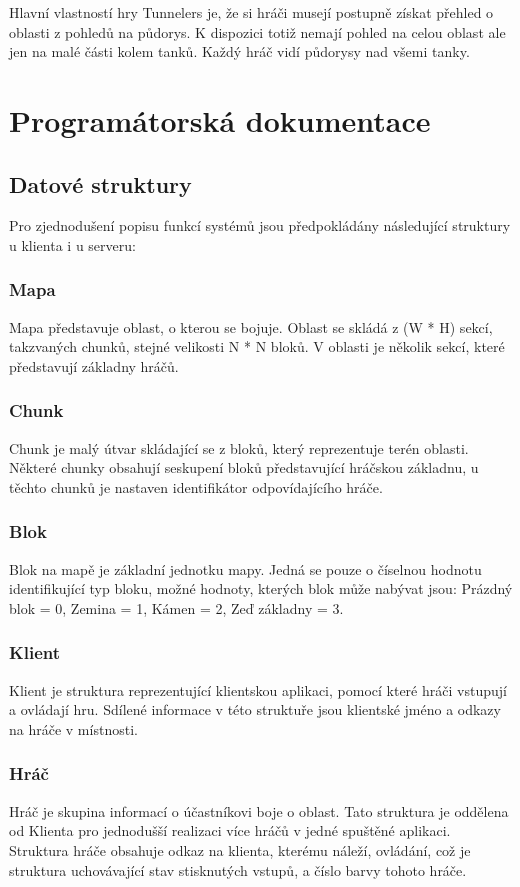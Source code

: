 \documentclass[12pt,a4paper]{article}
\let\oldsection\section
\renewcommand\section{\clearpage\oldsection}
\begin{document}
Hlavní vlastností hry Tunnelers je, že si hráči musejí postupně získat přehled o oblasti z pohledů na půdorys. K dispozici totiž nemají pohled na celou oblast ale jen na malé části kolem tanků. Každý hráč vidí půdorysy nad všemi tanky.


\section{Programátorská dokumentace}
\subsection{Datové struktury}
Pro zjednodušení popisu funkcí systémů jsou předpokládány následující struktury u klienta i u serveru:
\subsubsection*{Mapa}
Mapa představuje oblast, o kterou se bojuje. Oblast se skládá z (W * H) sekcí, takzvaných chunků, stejné velikosti N * N bloků. V oblasti je několik sekcí, které představují základny hráčů.
\subsubsection*{Chunk}
Chunk je malý útvar skládající se z bloků, který reprezentuje terén oblasti. Některé chunky obsahují seskupení bloků představující hráčskou základnu, u těchto chunků je nastaven identifikátor odpovídajícího hráče.
\subsubsection*{Blok}
Blok na mapě je základní jednotku mapy. Jedná se pouze o číselnou hodnotu identifikující typ bloku, možné hodnoty, kterých blok může nabývat jsou: Prázdný blok = 0, Zemina = 1, Kámen = 2, Zeď základny = 3.
\subsubsection*{Klient}
Klient je struktura reprezentující klientskou aplikaci, pomocí které hráči vstupují a ovládají hru. Sdílené informace v této struktuře jsou klientské jméno a odkazy na hráče v místnosti.
\subsubsection*{Hráč}
Hráč je skupina informací o účastníkovi boje o oblast. Tato struktura je oddělena od Klienta pro jednodušší realizaci více hráčů v jedné spuštěné aplikaci. Struktura hráče obsahuje odkaz na klienta, kterému náleží, ovládání, což je struktura uchovávající stav stisknutých vstupů, a číslo barvy tohoto hráče.
\end{document}
